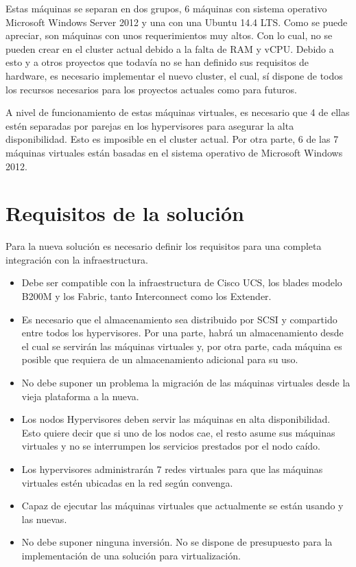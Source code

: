 \documentclass[12pt,a4paper,titlepage,twoside]{report}
\begin{document}
Estas máquinas se separan en dos grupos, 6 máquinas con sistema operativo Microsoft Windows Server 2012 y una con una Ubuntu 14.4 LTS.
Como se puede apreciar, son máquinas con unos requerimientos muy altos. Con lo cual, no se pueden crear en el cluster actual debido a la falta de RAM y vCPU. Debido a esto y a otros proyectos que todavía no se han definido sus requisitos de hardware, es necesario implementar el nuevo cluster, el cual, sí dispone de todos los recursos necesarios para los proyectos actuales como para futuros.
\par
A nivel de funcionamiento de estas máquinas virtuales, es necesario que 4 de ellas estén separadas por parejas en los hypervisores para asegurar la alta disponibilidad. Esto es imposible en el cluster actual. Por otra parte, 6 de las 7 máquinas virtuales están basadas en el sistema operativo de Microsoft Windows 2012.
\section{Requisitos de la solución}

Para la nueva solución es necesario definir los requisitos para una completa integración con la infraestructura.
\begin{itemize}
    \item Debe ser compatible con la infraestructura de Cisco UCS, los blades modelo B200M y los Fabric, tanto Interconnect como los Extender.
    \item Es necesario que el almacenamiento sea distribuido por SCSI y compartido entre todos los hypervisores. Por una parte, habrá un almacenamiento desde el cual se servirán las máquinas virtuales y, por otra parte, cada máquina es posible que requiera de un almacenamiento adicional para su uso.
    \item No debe suponer un problema la migración de las máquinas virtuales desde la vieja plataforma a la nueva.
    \item Los nodos Hypervisores deben servir las máquinas en alta disponibilidad. Esto quiere decir que si uno de los nodos cae, el resto asume sus máquinas virtuales y no se interrumpen los servicios prestados por el nodo caído.
    \item Los hypervisores administrarán 7 redes virtuales para que las máquinas virtuales estén ubicadas en la red según convenga.
    \item Capaz de ejecutar las máquinas virtuales que actualmente se están usando y las nuevas.
    \item No debe suponer ninguna inversión. No se dispone de presupuesto para la implementación de una solución para virtualización.
\end{itemize}
\end{document}
